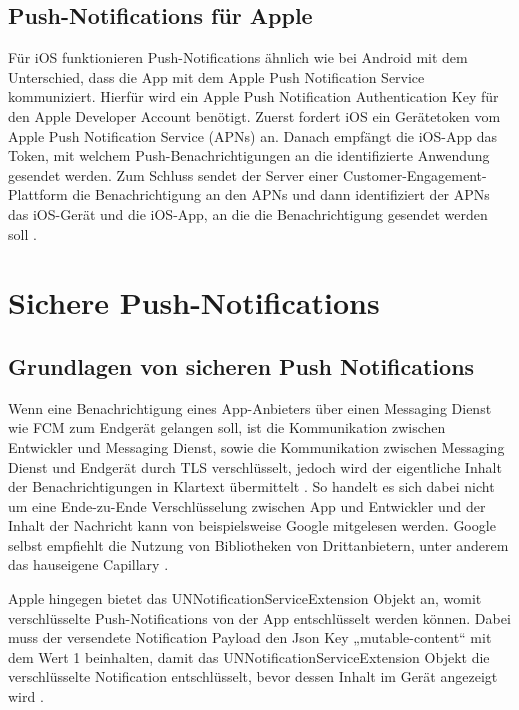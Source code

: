 \documentclass[sigconf]{acmart}
\begin{document}
\subsection{Push-Notifications für Apple}

Für iOS funktionieren Push-Notifications ähnlich wie bei Android 
mit dem Unterschied, dass die App mit dem Apple Push Notification 
Service kommuniziert. Hierfür wird ein Apple Push Notification 
Authentication Key für den Apple Developer Account benötigt. 
Zuerst fordert iOS ein Gerätetoken vom Apple Push Notification 
Service (APNs) an. Danach empfängt die iOS-App das Token, mit 
welchem Push-Benachrichtigungen an die identifizierte Anwendung 
gesendet werden. Zum Schluss sendet der Server einer 
Customer-Engagement-Plattform die Benachrichtigung an den APNs 
und dann identifiziert der APNs das iOS-Gerät und die iOS-App, 
an die die Benachrichtigung gesendet werden soll \cite{apple}.

\section{Sichere Push-Notifications}

\subsection{Grundlagen von sicheren Push Notifications}

Wenn eine Benachrichtigung eines App-Anbieters über einen Messaging 
Dienst wie FCM zum Endgerät gelangen soll, ist die Kommunikation 
zwischen Entwickler und Messaging Dienst, sowie die Kommunikation 
zwischen Messaging Dienst und Endgerät durch TLS verschlüsselt, 
jedoch wird der eigentliche Inhalt der Benachrichtigungen in Klartext 
übermittelt \cite{capillary}. So handelt es sich dabei nicht um eine 
Ende-zu-Ende Verschlüsselung zwischen App und Entwickler und der Inhalt der Nachricht kann von 
beispielsweise Google mitgelesen werden.
Google selbst empfiehlt die Nutzung von Bibliotheken von Drittanbietern, 
unter anderem das hauseigene Capillary \cite{firebase2}.

Apple hingegen bietet das UNNotificationServiceExtension Objekt an, 
womit verschlüsselte Push-Notifications von der App entschlüsselt 
werden können. Dabei muss der versendete Notification Payload den 
Json Key „mutable-content“ mit dem Wert 1 beinhalten, damit das 
UNNotificationServiceExtension Objekt die verschlüsselte Notification 
entschlüsselt, bevor dessen Inhalt im Gerät angezeigt wird \cite{apple1}\cite{apple2}.
\end{document}
